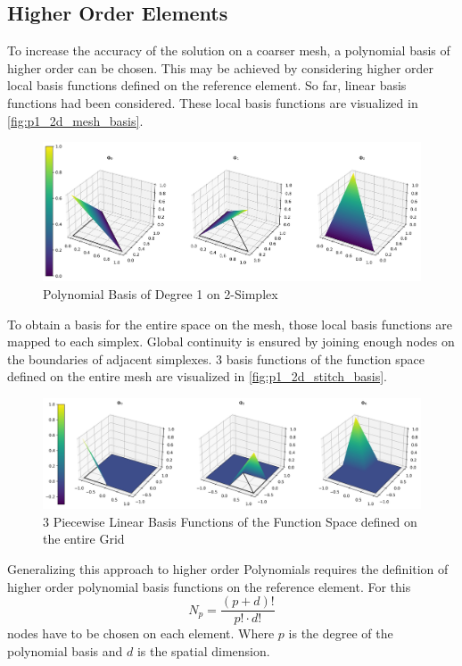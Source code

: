 \documentclass[11pt,a4paper]{article}
\begin{document}
\begin{multicols}{2}
\subsection*{Higher Order Elements}
To increase the accuracy of the solution on a coarser mesh, a polynomial basis
of higher order can be chosen.
This may be achieved by considering higher order local basis functions defined on the reference element.
So far, linear basis functions had been considered. These local basis functions are visualized in \autoref{fig:p1_2d_mesh_basis}.
\begin{figure}[H]
  \centering
  \includegraphics[width=.9\linewidth]{p1_2d_mesh_basis}
  \caption{Polynomial Basis of Degree 1 on 2-Simplex}
  \label{fig:p1_2d_mesh_basis}
\end{figure}

To obtain a basis for the entire space on the mesh, those local basis functions are mapped to each simplex.
Global continuity is ensured by joining enough nodes on the boundaries of adjacent simplexes.
3 basis functions of the function space defined on the entire mesh are visualized in \autoref{fig:p1_2d_stitch_basis}.
\begin{figure}[H]
  \centering
  \includegraphics[width=.9\linewidth]{p1_2d_stitch_basis}
  \caption{3 Piecewise Linear Basis Functions of the Function Space defined on the entire Grid}
  \label{fig:p1_2d_stitch_basis}
\end{figure}


Generalizing this approach to higher order Polynomials requires the definition of higher order polynomial
basis functions on the reference element. For this
$$N_p = \frac{(p+d)!}{p! \cdot d!}$$
nodes have to be chosen on each element. Where $p$ is the degree of the polynomial basis and $d$ is the spatial dimension.


\end{multicols}
\end{document}
